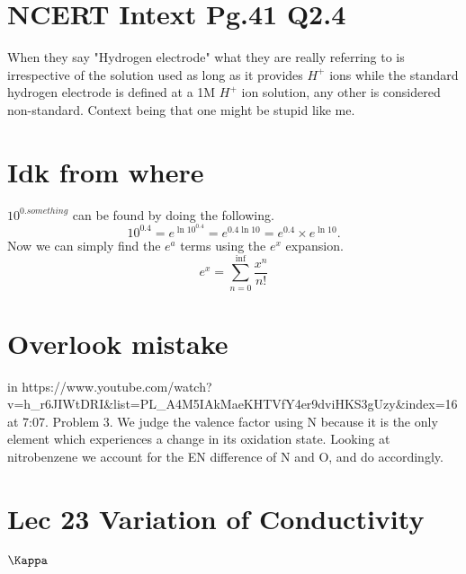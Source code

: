 \documentclass[12pt]{article}
\begin{document}
\section*{NCERT Intext Pg.41 Q2.4}
When they say "Hydrogen electrode" what they are really referring to is irrespective of the solution used as long as it provides $H^{+}$ ions while the standard hydrogen electrode is defined at a 1M $H^{+}$ ion solution, any other is considered non-standard. Context being that one might be stupid like me. 
\vspace{1cm}

\section*{Idk from where}
$10^{0.something}$ can be found by doing the following.
\[
10^{0.4} = e^{\ln 10^{0.4}} = e^{0.4{\ln 10}} = e^{0.4}\times e^{\ln 10}.
\]
Now we can simply find the $e^{a}$ terms using the $e^{x}$ expansion.
\[
e^{x} = \sum_{n=0}^{\inf} \frac{x^{n}}{n!} 
\]

\section*{Overlook mistake}
in https://www.youtube.com/watch?v=h_r6JIWtDRI&list=PL_A4M5IAkMaeKHTVfY4er9dviHKS3gUzy&index=16 at 7:07. Problem 3. We judge the valence factor using N because it is the only element which experiences a change in its oxidation state. Looking at nitrobenzene we account for the EN difference of N and O, and do accordingly.

\section*{Lec 23 Variation of Conductivity{$\Kappa$}}
\end{document}
